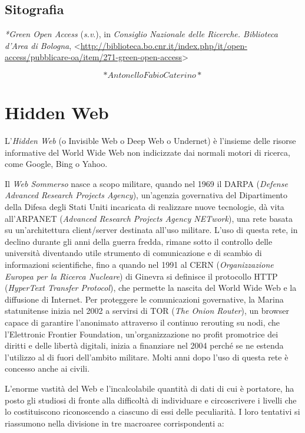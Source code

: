 \documentclass[
  b5paper,
  twoside,
  11pt,
  chapterprefix=false,
  bibliography=totocnumbered,
  parskip=0]{scrbook}
\begin{document}
\hypertarget{sitografia-15}{%
\section*{Sitografia}\label{sitografia-15}}

\emph{*Green Open Access} (\emph{s.v}.), in \emph{Consiglio Nazionale delle Ricerche.
Biblioteca d'Area di Bologna},
\textless{}{\url{http://biblioteca.bo.cnr.it/index.php/it/open-access/pubblicare-oa/item/271-green-open-access}\textgreater{}}

\[*Antonello Fabio Caterino*\]

\hypertarget{hidden-web}{%
\chapter{Hidden Web}\label{hidden-web}}

L'\emph{Hidden Web} (o Invisible Web o Deep Web o Undernet) è l'insieme delle
risorse informative del World Wide Web non indicizzate dai normali
motori di ricerca, come Google, Bing o Yahoo.

Il \emph{Web Sommerso} nasce a scopo militare, quando nel 1969 il DARPA
(\emph{Defense Advanced Research Projects Agency}), un'agenzia governativa
del Dipartimento della Difesa degli Stati Uniti incaricata di realizzare
nuove tecnologie, dà vita all'ARPANET (\emph{Advanced Research Projects
Agency NETwork}), una rete basata su un'architettura client/server
destinata all'uso militare. L'uso di questa rete, in declino durante gli
anni della guerra fredda, rimane sotto il controllo delle università
diventando utile strumento di comunicazione e di scambio di informazioni
scientifiche, fino a quando nel 1991 al CERN (\emph{Organizzazione Europea
per la Ricerca Nucleare}) di Ginevra si definisce il protocollo HTTP
(\emph{HyperText Transfer Protocol}), che permette la nascita del World Wide
Web e la diffusione di Internet. Per proteggere le comunicazioni
governative, la Marina statunitense inizia nel 2002 a servirsi di TOR
(\emph{The Onion Router}), un browser capace di garantire l'anonimato
attraverso il continuo rerouting su nodi, che l'Elettronic Frontier
Foundation, un'organizzazione no profit promotrice dei diritti e delle
libertà digitali, inizia a finanziare nel 2004 perché se ne estenda
l'utilizzo al di fuori dell'ambito militare. Molti anni dopo l'uso di
questa rete è concesso anche ai civili.

L'enorme vastità del Web e l'incalcolabile quantità di dati di cui è
portatore, ha posto gli studiosi di fronte alla difficoltà di
individuare e circoscrivere i livelli che lo costituiscono riconoscendo
a ciascuno di essi delle peculiarità. I loro tentativi si riassumono
nella divisione in tre macroaree corrispondenti a:
\end{document}
